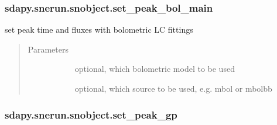 \documentclass[letterpaper,10pt,english]{sphinxmanual}
\begin{document}
\begin{fulllineitems}
\begin{fulllineitems}
\end{fulllineitems}



\subsubsection{sdapy.snerun.snobject.set\_peak\_bol\_main}
\label{\detokenize{generated/sdapy.snerun.snobject.set_peak_bol_main:sdapy-snerun-snobject-set-peak-bol-main}}\label{\detokenize{generated/sdapy.snerun.snobject.set_peak_bol_main::doc}}

\begin{fulllineitems}
\label{\detokenize{generated/sdapy.snerun.snobject.set_peak_bol_main:sdapy.snerun.snobject.set_peak_bol_main}}
set peak time and fluxes with bolometric LC fittings
\begin{quote}\begin{description}
\item[{Parameters}] \leavevmode\begin{description}
\item[{}] \leavevmode{[}\sphinxtitleref{str}{]}
optional, which bolometric model to be used

\item[{}] \leavevmode{[}\sphinxtitleref{str}{]}
optional, which source to be used, e.g. mbol or mbolbb

\end{description}

\end{description}\end{quote}

\end{fulllineitems}



\subsubsection{sdapy.snerun.snobject.set\_peak\_gp}
\label{\detokenize{generated/sdapy.snerun.snobject.set_peak_gp:sdapy-snerun-snobject-set-peak-gp}}\label{\detokenize{generated/sdapy.snerun.snobject.set_peak_gp::doc}}


\end{fulllineitems}
\end{document}
